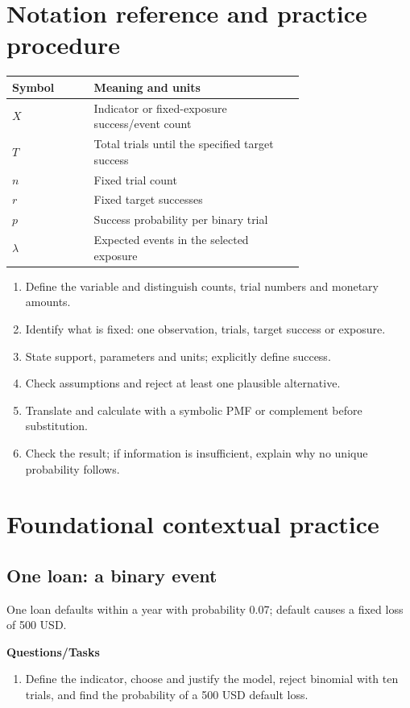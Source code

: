 \section{Notation reference and practice procedure}
\begin{center}
\begin{tabular}{lp{0.72\linewidth}}
\toprule
Symbol & Meaning and units \\ \midrule
$X$ & Indicator or fixed-exposure success/event count \\
$T$ & Total trials until the specified target success \\
$n$ & Fixed trial count \\
$r$ & Fixed target successes \\
$p$ & Success probability per binary trial \\
$\lambda$ & Expected events in the selected exposure \\
\bottomrule
\end{tabular}
\end{center}
\begin{enumerate}
\item Define the variable and distinguish counts, trial numbers and monetary amounts.
\item Identify what is fixed: one observation, trials, target success or exposure.
\item State support, parameters and units; explicitly define success.
\item Check assumptions and reject at least one plausible alternative.
\item Translate and calculate with a symbolic PMF or complement before substitution.
\item Check the result; if information is insufficient, explain why no unique probability follows.
\end{enumerate}
\section{Foundational contextual practice}\label{sec:t2-c9-foundational}
\subsection{One loan: a binary event}
One loan defaults within a year with probability 0.07; default causes a fixed loss of 500 USD.

\textbf{Questions/Tasks}
\begin{enumerate}
\item Define the indicator, choose and justify the model, reject binomial with ten trials, and find the probability of a 500 USD default loss.
\end{enumerate}
